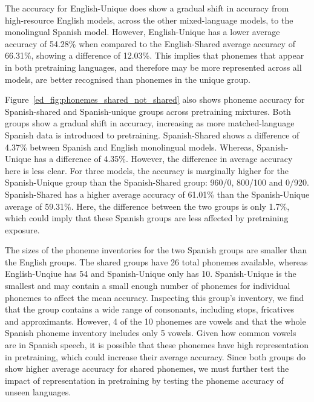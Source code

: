 The accuracy for English-Unique does show a gradual shift in accuracy from high-resource English models, across the other mixed-language models, to the monolingual Spanish model. However, English-Unique has a lower average accuracy of 54.28\% when compared to the English-Shared average accuracy of 66.31\%, showing a difference of 12.03\%. This implies that phonemes that appear in both pretraining languages, and therefore may be more represented across all models, are better recognised than phonemes in the unique group.

Figure~\ref{ed_fig:phonemes_shared_not_shared} also shows phoneme accuracy for Spanish-shared and Spanish-unique groups across pretraining mixtures. Both groups show a gradual shift in accuracy, increasing as more matched-language Spanish data is introduced to pretraining. Spanish-Shared shows a difference of 4.37\% between Spanish and English monolingual models. Whereas, Spanish-Unique has a difference of 4.35\%. However, the difference in average accuracy here is less clear. For three models, the accuracy is marginally higher for the Spanish-Unique group than the Spanish-Shared group: 960/0, 800/100 and 0/920. Spanish-Shared has a higher average accuracy of 61.01\% than the Spanish-Unique average of 59.31\%. Here, the difference between the two groups is only 1.7\%, which could imply that these Spanish groups are less affected by pretraining exposure.

The sizes of the phoneme inventories for the two Spanish groups are smaller than the English groups. The shared groups have 26 total phonemes available, whereas English-Unqiue has 54 and Spanish-Unique only has 10. Spanish-Unique is the smallest and may contain a small enough number of phonemes for individual phonemes to affect the mean accuracy. Inspecting this group's inventory, we find that the group contains a wide range of consonants, including stops, fricatives and approximants. However, 4 of the 10 phonemes are vowels and that the whole Spanish phoneme inventory includes only 5 vowels. Given how common vowels are in Spanish speech, it is possible that these phonemes have high representation in pretraining, which could increase their average accuracy. Since both groups do show higher average accuracy for shared phonemes, we must further test the impact of representation in pretraining by testing the phoneme accuracy of unseen languages.


